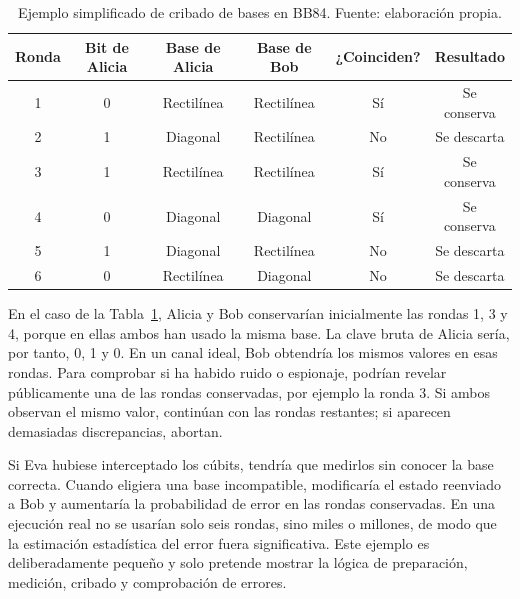 \begin{table}[h]
    \centering
    \small
    \begin{tabular}{c c c c c c}
        \hline\hline
        Ronda & Bit de Alicia & Base de Alicia & Base de Bob & ¿Coinciden? & Resultado \\
        \hline
        1 & 0 & Rectilínea & Rectilínea & Sí & Se conserva \\
        2 & 1 & Diagonal & Rectilínea & No & Se descarta \\
        3 & 1 & Rectilínea & Rectilínea & Sí & Se conserva \\
        4 & 0 & Diagonal & Diagonal & Sí & Se conserva \\
        5 & 1 & Diagonal & Rectilínea & No & Se descarta \\
        6 & 0 & Rectilínea & Diagonal & No & Se descarta \\
        \hline
    \end{tabular}
    \caption[Ejemplo de cribado en BB84]{Ejemplo simplificado de cribado de bases en BB84. Fuente: elaboración propia.}
    \label{tab:bb84_ejemplo}
\end{table}

En el caso de la Tabla~\ref{tab:bb84_ejemplo}, Alicia y Bob conservarían inicialmente las rondas 1, 3 y 4, porque en ellas ambos han usado la misma base. La clave bruta de Alicia sería, por tanto, 0, 1 y 0. En un canal ideal, Bob obtendría los mismos valores en esas rondas. Para comprobar si ha habido ruido o espionaje, podrían revelar públicamente una de las rondas conservadas, por ejemplo la ronda 3. Si ambos observan el mismo valor, continúan con las rondas restantes; si aparecen demasiadas discrepancias, abortan.

Si Eva hubiese interceptado los cúbits, tendría que medirlos sin conocer la base correcta. Cuando eligiera una base incompatible, modificaría el estado reenviado a Bob y aumentaría la probabilidad de error en las rondas conservadas. En una ejecución real no se usarían solo seis rondas, sino miles o millones, de modo que la estimación estadística del error fuera significativa. Este ejemplo es deliberadamente pequeño y solo pretende mostrar la lógica de preparación, medición, cribado y comprobación de errores.